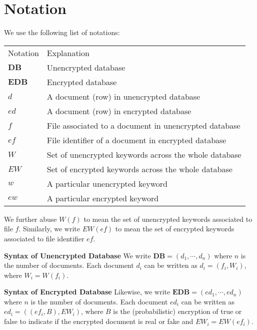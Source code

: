 \documentclass{article}
\newcommand{\db}{\textbf{DB}}
\newcommand{\edb}{\textbf{EDB}}
\newcommand{\doc}{d}
\newcommand{\edoc}{ed}
\newcommand{\file}{f}
\newcommand{\efile}{ef}
\newcommand{\kwset}{W}
\newcommand{\ekwset}{EW}
\newcommand{\kw}{w}
\newcommand{\ekw}{ew}
\newcommand{\boolean}{B}
\begin{document}
\section{Notation}
We use the following list of notations:
\begin{table}[H]
	\centering
	\begin{tabular}{ll}
		Notation  & Explanation               				\\
		$\db$     & Unencrypted database      				\\
		$\edb$    & Encrypted database        				\\
		$\doc$    & A document (row) in unencrypted database \\
		$\edoc$   & A document (row) in encrypted database   \\
		$\file$   & File associated to a document in unencrypted database \\
		$\efile$  & File identifier of a document in encrypted database   \\
		$\kwset$  & Set of unencrypted keywords across the whole database \\
		$\ekwset$ & Set of encrypted keywords across the whole database   \\
		$\kw$     & A particular unencrypted keyword \\
		$\ekw$    & A particular encrypted keyword
	\end{tabular}
\end{table}

We further abuse $\kwset(\file)$ to mean the set of unencrypted keywords associated to file $\file$. Similarly, we write $\ekwset(\efile)$ to mean the set of encrypted keywords associated to file identifier $\efile$.

\textbf{Syntax of Unencrypted Database} We write $\db = (\doc_1, \cdots, \doc_n)$ where $n$ is the number of documents. Each document $\doc_i$ can be written as $\doc_i = (\file_i, \kwset_i)$, where $\kwset_i = \kwset(\file_i)$.

\textbf{Syntax of Encrypted Database} Likewise, we write $\edb = (\edoc_1, \cdots, \edoc_n)$ where $n$ is the number of documents. Each document $\edoc_i$ can be written as $\edoc_i = ((\efile_i, \boolean), \ekwset_i)$, where $\boolean$ is the (probabilistic) encryption of true or false to indicate if the encrypted document is real or fake and $\ekwset_i = \ekwset(\efile_i)$.
\end{document}
